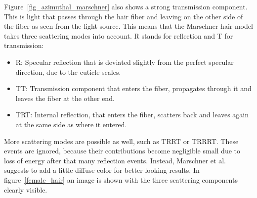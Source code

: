 \documentclass[11pt,a4paper]{report}
\begin{document}
Figure~\ref{fig_azimuthal_marschner} also shows a strong transmission component. This is light that passes through the hair fiber and leaving on the other side of the fiber as seen from the light source. This means that the Marschner hair model takes three scattering modes into account. R stands for reflection and T for transmission:

\begin{itemize}
\item R: Specular reflection that is deviated slightly from the perfect specular direction, due to the cuticle scales.
\item TT: Transmission component that enters the fiber, propagates through it and leaves the fiber at the other end.
\item TRT: Internal reflection, that enters the fiber, scatters back and leaves again at the same side as where it entered.
\end{itemize}

More scattering modes are possible as well, such as TRRT or TRRRT. These events are ignored, because their contributions become negligible small due to loss of energy after that many reflection events. Instead, Marschner et al.~\cite{marschner} suggests to add a little diffuse color for better looking results. In figure~\ref{female_hair} an image is shown with the three scattering components clearly visible.
\end{document}
